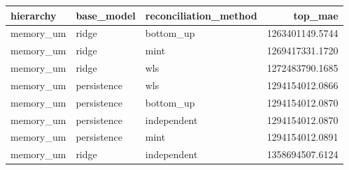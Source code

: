 \begin{tabular}{lllr}
\toprule
hierarchy & base_model & reconciliation_method & top_mae \\
\midrule
memory_um & ridge & bottom_up & 1263401149.5744 \\
memory_um & ridge & mint & 1269417331.1720 \\
memory_um & ridge & wls & 1272483790.1685 \\
memory_um & persistence & wls & 1294154012.0866 \\
memory_um & persistence & bottom_up & 1294154012.0870 \\
memory_um & persistence & independent & 1294154012.0870 \\
memory_um & persistence & mint & 1294154012.0891 \\
memory_um & ridge & independent & 1358694507.6124 \\
\bottomrule
\end{tabular}
